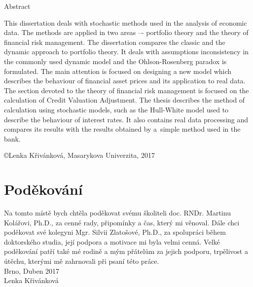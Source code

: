 \documentclass[a4paper,12pt]{report}
\theoremstyle{definition} \newtheorem{definice}[veta]{Definice}
\theoremstyle{remark}
\begin{document}
\begin{flushright} {{\Huge Abstract}} \vspace{38pt} \end{flushright}
This dissertation deals with stochastic methods used in the analysis of economic data. 
The methods are applied in two areas –- portfolio theory and the theory of financial risk management. 
The dissertation compares the classic and the dynamic approach to portfolio theory. 
It deals with assumptions inconsistency in the commonly used dynamic model and the Ohlson-Rosenberg paradox is formulated. 
The main attention is focused on designing a new model which describes the behaviour of financial asset prices and its application to real data. 
The section devoted to the theory of financial risk management is focused on the calculation of Credit Valuation Adjustment. 
The thesis describes the method of calculation using stochastic models, such as the Hull-White model used to describe the behaviour of interest rates. 
It also contains real data processing and compares its results with the results obtained by a~simple method used in the bank.

\newpage
\pagestyle{empty}
\null
\vfill
\begin{center}
\copyright \quad Lenka Křivánková, Masarykova Univerzita, 2017
\end{center}

\chapter*{Poděkování}%
\thispagestyle{empty}
\pagestyle{plain}
Na tomto místě bych chtěla poděkovat svému školiteli doc. RNDr. Martinu Kolářovi, Ph.D., za cenné rady, připomínky a čas, který mi věnoval.
Dále chci poděkovat své kolegyni Mgr. Silvii Zlatošové, Ph.D., za spolupráci během doktorského studia, její podpora a motivace mi byla velmi cenná.
Velké poděkování patří také mé rodině a mým přátelům za jejich podporu, trpělivost a útěchu, kterými mě zahrnovali při psaní této práce.
\\

Brno, Duben 2017
\\

Lenka Křivánková
\end{document}
